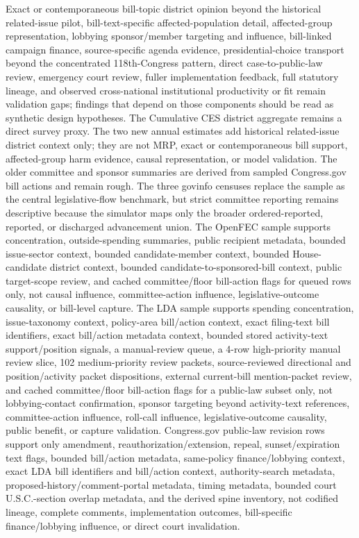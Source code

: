 \documentclass[manuscript]{acmart}
\begin{document}
Exact or contemporaneous bill-topic district opinion beyond the historical related-issue pilot, bill-text-specific affected-population detail, affected-group representation, lobbying sponsor/member targeting and influence, bill-linked campaign finance, source-specific agenda evidence, presidential-choice transport beyond the concentrated 118th-Congress pattern, direct case-to-public-law review, emergency court review, fuller implementation feedback, full statutory lineage, and observed cross-national institutional productivity or fit remain validation gaps; findings that depend on those components should be read as synthetic design hypotheses.
The Cumulative CES district aggregate remains a direct survey proxy. The two new annual estimates add historical related-issue district context only; they are not MRP, exact or contemporaneous bill support, affected-group harm evidence, causal representation, or model validation.
The older committee and sponsor summaries are derived from sampled Congress.gov bill actions and remain rough. The three govinfo censuses replace the sample as the central legislative-flow benchmark, but strict committee reporting remains descriptive because the simulator maps only the broader ordered-reported, reported, or discharged advancement union.
The OpenFEC sample supports concentration, outside-spending summaries, public recipient metadata, bounded issue-sector context, bounded candidate-member context, bounded House-candidate district context, bounded candidate-to-sponsored-bill context, public target-scope review, and cached committee/floor bill-action flags for queued rows only, not causal influence, committee-action influence, legislative-outcome causality, or bill-level capture.
The LDA sample supports spending concentration, issue-taxonomy context, policy-area bill/action context, exact filing-text bill identifiers, exact bill/action metadata context, bounded stored activity-text support/position signals, a manual-review queue, a 4-row high-priority manual review slice, 102 medium-priority review packets, source-reviewed directional and position/activity packet dispositions, external current-bill mention-packet review, and cached committee/floor bill-action flags for a public-law subset only, not lobbying-contact confirmation, sponsor targeting beyond activity-text references, committee-action influence, roll-call influence, legislative-outcome causality, public benefit, or capture validation.
Congress.gov public-law revision rows support only amendment, reauthorization/extension, repeal, sunset/expiration text flags, bounded bill/action metadata, same-policy finance/lobbying context, exact LDA bill identifiers and bill/action context, authority-search metadata, proposed-history/comment-portal metadata, timing metadata, bounded court U.S.C.-section overlap metadata, and the derived spine inventory, not codified lineage, complete comments, implementation outcomes, bill-specific finance/lobbying influence, or direct court invalidation.
\end{document}
